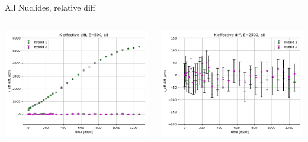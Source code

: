 \documentclass[
	11pt, %
	aspectratio=169, %
]{beamer}
\begin{document}
\begin{frame}{All Nuclides, relative diff}
\begin{columns}[c]
\begin{column}{0.39\textwidth}
			\includegraphics[width=\textwidth]{../figures/keff/keff_all_500_diff.png}
		\end{column}
		\begin{column}{0.39\textwidth}
			\includegraphics[width=\textwidth]{../figures/keff/keff_all_2500_diff.png}


\end{column}
\end{columns}
\end{frame}
\end{document}
